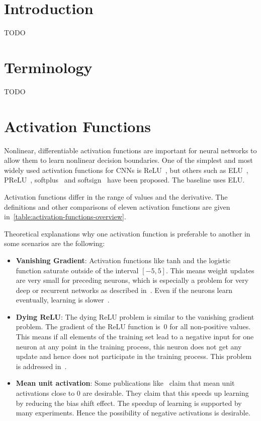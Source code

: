 \section{Introduction}
TODO\cite{Thoma:2014}

\section{Terminology}
TODO


\section{Activation Functions}
Nonlinear, differentiable activation functions are important for neural
networks to allow them to learn nonlinear decision boundaries. One of the
simplest and most widely used activation functions for \glspl{CNN} is
\gls{ReLU}~\cite{AlexNet-2012}, but others such as
\gls{ELU}~\cite{clevert2015fast}, \gls{PReLU}~\cite{he2015delving}, softplus~\cite{7280459}
and softsign~\cite{bergstra2009quadratic} have been proposed. The baseline uses
\gls{ELU}.

Activation functions differ in the range of values and the derivative. The
definitions and other comparisons of eleven activation functions are given
in~\cref{table:activation-functions-overview}.

Theoretical explanations why one activation function is preferable to another
in some scenarios are the following:
\begin{itemize}
    \item \textbf{Vanishing Gradient}: Activation functions like tanh and the
          logistic function saturate outside of the interval $[-5, 5]$. This
          means weight updates are very small for preceding neurons, which is
          especially a problem for very deep or recurrent networks as described
          in~\cite{bengio1994learning}. Even if the neurons learn eventually,
          learning is slower~\cite{AlexNet-2012}.
    \item \textbf{Dying ReLU}: The dying \gls{ReLU} problem is similar to the
          vanishing gradient problem. The gradient of the \gls{ReLU} function
          is~0 for all non-positive values. This means if all elements of the
          training set lead to a negative input for one neuron at any point in
          the training process, this neuron does not get any update and hence
          does not participate in the training process. This problem is
          addressed in~\cite{maas2013rectifier}.
    \item \textbf{Mean unit activation}: Some publications
          like~\cite{clevert2015fast,BatchNormalization-2015} claim that mean
          unit activations close to 0 are desirable. They claim that this
          speeds up learning by reducing the bias shift effect. The speedup
          of learning is supported by many experiments. Hence the possibility
          of negative activations is desirable.
\end{itemize}

